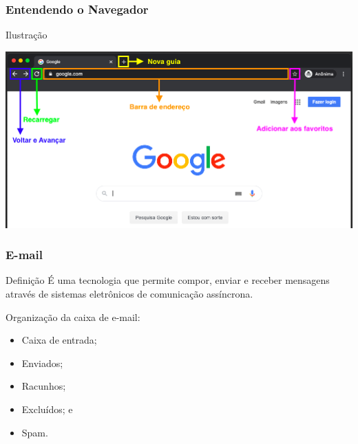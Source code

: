 \documentclass[aspectratio=169]{beamer} %
\begin{document}
\begin{frame}
	\frametitle{Entendendo o Navegador}

	\begin{exampleblock}{Ilustra\c cão}
		\begin{center}
			\includegraphics[scale=0.35]{img/navegador}
		\end{center}
	\end{exampleblock}	
\end{frame}

\begin{frame}
	\frametitle{E-mail}

	\begin{block}{Defini\c cão}
		É uma tecnologia que permite compor, enviar e receber mensagens através de sistemas eletrônicos de comunicação assíncrona.
	\end{block} \vfill
	
	Organiza\c cão da caixa de e-mail:
	\begin{itemize}
		\item Caixa de entrada;
		\item Enviados;
		\item Racunhos;
		\item Excluídos; e
		\item Spam.
	\end{itemize}
\end{frame}
\end{document}

